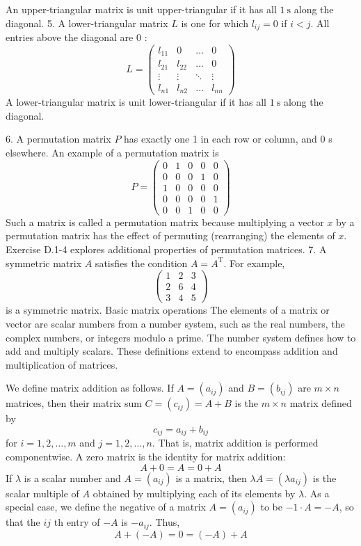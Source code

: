 \documentclass[lang=cn,newtx,10pt,scheme=chinese]{elegantbook}
\begin{document}
An upper-triangular matrix is unit upper-triangular if it has all $1 \mathrm{~s}$ along the diagonal.
5. A lower-triangular matrix $L$ is one for which $l_{i j}=0$ if $i<j$. All entries above the diagonal are 0 :
$$
L=\left(\begin{array}{cccc}
l_{11} & 0 & \ldots & 0 \\
l_{21} & l_{22} & \ldots & 0 \\
\vdots & \vdots & \ddots & \vdots \\
l_{n 1} & l_{n 2} & \ldots & l_{n n}
\end{array}\right)
$$
A lower-triangular matrix is unit lower-triangular if it has all $1 \mathrm{~s}$ along the diagonal.

6. A permutation matrix $P$ has exactly one 1 in each row or column, and 0 s elsewhere. An example of a permutation matrix is
$$
P=\left(\begin{array}{lllll}
0 & 1 & 0 & 0 & 0 \\
0 & 0 & 0 & 1 & 0 \\
1 & 0 & 0 & 0 & 0 \\
0 & 0 & 0 & 0 & 1 \\
0 & 0 & 1 & 0 & 0
\end{array}\right)
$$
Such a matrix is called a permutation matrix because multiplying a vector $x$ by a permutation matrix has the effect of permuting (rearranging) the elements of $x$. Exercise D.1-4 explores additional properties of permutation matrices.
7. A symmetric matrix $A$ satisfies the condition $A=A^{\mathrm{T}}$. For example,
$$
\left(\begin{array}{lll}
1 & 2 & 3 \\
2 & 6 & 4 \\
3 & 4 & 5
\end{array}\right)
$$
is a symmetric matrix.
Basic matrix operations
The elements of a matrix or vector are scalar numbers from a number system, such as the real numbers, the complex numbers, or integers modulo a prime. The number system defines how to add and multiply scalars. These definitions extend to encompass addition and multiplication of matrices.

We define matrix addition as follows. If $A=\left(a_{i j}\right)$ and $B=\left(b_{i j}\right)$ are $m \times n$ matrices, then their matrix sum $C=\left(c_{i j}\right)=A+B$ is the $m \times n$ matrix defined by
$$
c_{i j}=a_{i j}+b_{i j}
$$
for $i=1,2, \ldots, m$ and $j=1,2, \ldots, n$. That is, matrix addition is performed componentwise. A zero matrix is the identity for matrix addition:
$$
A+0=A=0+A
$$
If $\lambda$ is a scalar number and $A=\left(a_{i j}\right)$ is a matrix, then $\lambda A=\left(\lambda a_{i j}\right)$ is the scalar multiple of $A$ obtained by multiplying each of its elements by $\lambda$. As a special case, we define the negative of a matrix $A=\left(a_{i j}\right)$ to be $-1 \cdot A=-A$, so that the $i j$ th entry of $-A$ is $-a_{i j}$. Thus,
$$
A+(-A)=0=(-A)+A
$$
\end{document}
